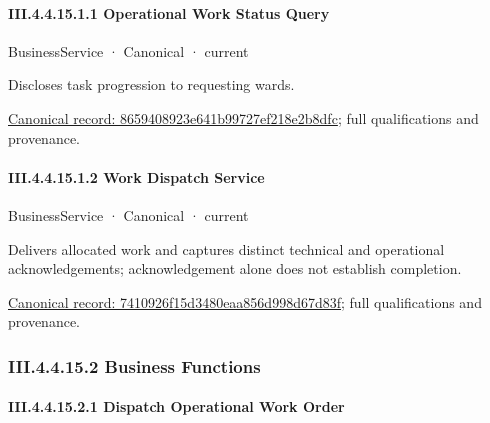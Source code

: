 \paragraph*{III.4.4.15.1.1 Operational Work Status Query}
\label{navigation:III.4.4.15.1.1}

\label{element:8659408923e641b99727ef218e2b8dfc}
{\small BusinessService · Canonical · current}\par

Discloses task progression to requesting wards.


{\footnotesize \href{../../../../../../../continuum/business/business-service/8659408923e641b99727ef218e2b8dfc.md}{Canonical record: 8659408923e641b99727ef218e2b8dfc}; full qualifications and provenance.}\par
\paragraph*{III.4.4.15.1.2 Work Dispatch Service}
\label{navigation:III.4.4.15.1.2}

\label{element:7410926f15d3480eaa856d998d67d83f}
{\small BusinessService · Canonical · current}\par

Delivers allocated work and captures distinct technical and operational acknowledgements; acknowledgement alone does not establish completion.


{\footnotesize \href{../../../../../../../continuum/business/business-service/7410926f15d3480eaa856d998d67d83f.md}{Canonical record: 7410926f15d3480eaa856d998d67d83f}; full qualifications and provenance.}\par
\subsubsection*{III.4.4.15.2 Business Functions}
\label{navigation:III.4.4.15.2}

\paragraph*{III.4.4.15.2.1 Dispatch Operational Work Order}
\label{navigation:III.4.4.15.2.1}

